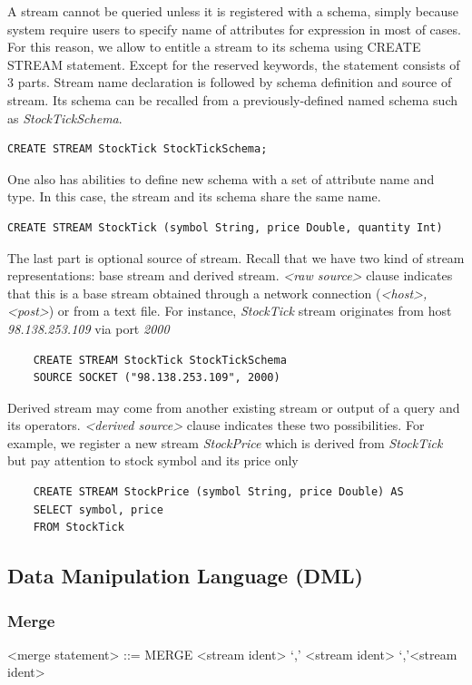A stream cannot be queried unless it is registered with a schema, simply because system require users to specify name of attributes for expression in most of cases. For this reason, we allow to entitle a stream to its schema using CREATE STREAM statement. Except for the reserved keywords, the statement consists of 3 parts. Stream name declaration is followed by schema definition and source of stream. Its schema can be recalled from a previously-defined named schema such as \textit{StockTickSchema}. 
\begin{verbatim}
CREATE STREAM StockTick StockTickSchema;
\end{verbatim}

One also has abilities to define new schema with a set of attribute name and type. In this case, the stream and its schema share the same name.
\begin{verbatim}
CREATE STREAM StockTick (symbol String, price Double, quantity Int)
\end{verbatim}

The last part is optional source of stream. Recall that we have two kind of stream representations: base stream and derived stream. \textit{<raw source>} clause indicates that this is a base stream obtained through a network connection (\textit{<host>, <post>}) or from a text file. For instance, \textit{StockTick} stream originates from host \textit{98.138.253.109} via port \textit{2000}

\begin{verbatim} 
	CREATE STREAM StockTick StockTickSchema 
	SOURCE SOCKET ("98.138.253.109", 2000)
\end{verbatim}

Derived stream may come from another existing stream or output of a query and its operators. \textit{<derived source>} clause indicates these two possibilities. For example, we register a new stream \textit{StockPrice} which is derived from \textit{StockTick} but pay attention to stock symbol and its price only
\begin{lstlisting}
	CREATE STREAM StockPrice (symbol String, price Double) AS
	SELECT symbol, price 
	FROM StockTick
\end{lstlisting}


\subsection{Data Manipulation Language (DML)}



\subsubsection{Merge}
\begin{grammar}
<merge statement> ::= MERGE <stream ident> `,' <stream ident> {`,'<stream ident>}
\end{grammar}

